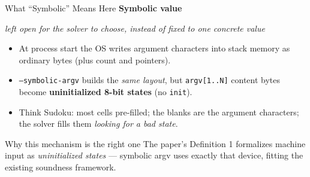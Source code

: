 \documentclass[aspectratio=169]{beamer}
\newcommand{\deflab}[2]{%
  \textbf{#1}\par\vspace{0.05cm}%
  {\color{blue!55!black}\itshape #2}\par\vspace{0.05cm}}
\newcommand{\keylab}[1]{\textbf{\color{blue!55!black}#1}}
\newcommand{\flag}[1]{\texttt{\small #1}}
\begin{document}
\begin{frame}{What ``Symbolic'' Means Here}
  \deflab{Symbolic value}{left open for the solver to choose, instead of
          fixed to one concrete value}
  \begin{itemize}\setlength\itemsep{0.3em}
    \item At process start the OS writes argument characters into stack
          memory as ordinary bytes (plus count and pointers).
    \item \flag{--symbolic-argv} builds the \emph{same layout}, but
          \texttt{argv[1..N]} content bytes become
          \keylab{uninitialized 8-bit states} (no \texttt{init}).
    \item Think Sudoku: most cells pre-filled; the blanks are the
          argument characters; the solver fills them
          \emph{looking for a bad state}.
  \end{itemize}
  \vspace{0.1cm}
  \begin{block}{Why this mechanism is the right one}
    The paper's Definition 1 formalizes machine input as
    \emph{uninitialized states} --- symbolic argv uses exactly that
    device, fitting the existing soundness framework.
  \end{block}
\end{frame}
\end{document}
